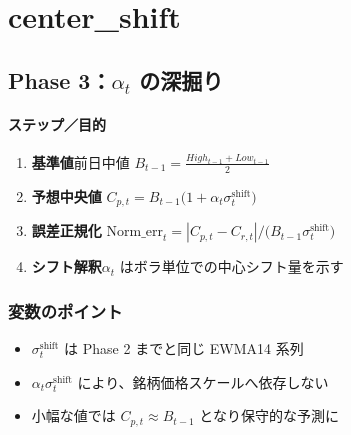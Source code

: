 
\section*{center\_shift}\nopagebreak[4]

\subsection*{Phase 3：$\alpha_t$ の深掘り}\nopagebreak[4]
\paragraph{ステップ／目的}
\begin{flushleft}
\begin{enumerate}
  \item \textbf{基準値}\;前日中値
        \(B_{t-1}=\tfrac{High_{t-1}+Low_{t-1}}{2}\)
  \item \textbf{予想中央値}\;
        \(C_{p,t}=B_{t-1}\bigl(1+\alpha_t\sigma_t^{\mathrm{shift}}\bigr)\)
  \item \textbf{誤差正規化}\;
        \(\mathrm{Norm\_err}_t
          =|C_{p,t}-C_{r,t}|\big/\bigl(B_{t-1}\sigma_t^{\mathrm{shift}}\bigr)\)
  \item \textbf{シフト解釈}\;\(\alpha_t\) はボラ単位での中心シフト量を示す
\end{enumerate}
\end{flushleft}

\subsubsection*{変数のポイント}
\begin{flushleft}
\begin{itemize}
  \item \(\sigma_t^{\mathrm{shift}}\) は Phase 2 までと同じ EWMA14 系列
  \item \(\alpha_t\sigma_t^{\mathrm{shift}}\) により、銘柄価格スケールへ依存しない
  \item 小幅な値では \(C_{p,t}\approx B_{t-1}\) となり保守的な予測に
\end{itemize}
\end{flushleft}

